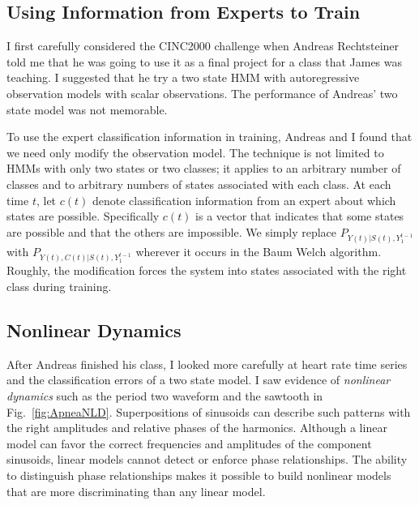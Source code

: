 \documentclass[]{article}
\newcommand{\ts}[3]{#1_{#2}^{#3}}                    %
\newcommand{\ti}[2]{{#1}{(#2)}}                  %
\begin{document}
\newcommand{\tmo}{i} %
\newcommand{\tex}{j} %
\newcommand{\tpo}{k} %

\subsection{Using Information from Experts to Train}

I first carefully considered the CINC2000 challenge when Andreas
Rechtsteiner told me that he was going to use it as a final project
for a class that James was teaching.  I suggested that he try a two
state HMM with autoregressive observation models with scalar observations.  The performance of Andreas' two state model was not
memorable.

To use the expert classification information in training, Andreas and
I found that we need only modify the observation model.  The technique
is not limited to HMMs with only two states or two classes; it applies
to an arbitrary number of classes and to arbitrary numbers of states
associated with each class.  At each time $t$, let $\ti{c}{t}$ denote
classification information from an expert about which states are
possible.  Specifically $\ti{c}{t}$ is a vector that indicates that
some states are possible and that the others are impossible.  We
simply replace $P_{\ti{Y}{t}|\ti{S}{t},\ts{Y}{1}{t-1}}$ with
$P_{\ti{Y}{t},\ti{C}{t}|\ti{S}{t},\ts{Y}{1}{t-1}}$ wherever it occurs
in the Baum Welch algorithm. Roughly, the
modification forces the system into states associated with the right
class during training.

\subsection{Nonlinear Dynamics}\label{sec:NLD}

After Andreas finished his class, I looked more carefully at heart
rate time series and the classification errors of a two state model.
I saw evidence of \emph{nonlinear dynamics} such as the period two
waveform and the sawtooth in Fig.~\ref{fig:ApneaNLD}.  Superpositions
of sinusoids can describe such patterns with the right amplitudes and
relative phases of the harmonics.  Although a linear model can favor
the correct frequencies and amplitudes of the component sinusoids,
linear models cannot detect or enforce phase relationships.  The
ability to distinguish phase relationships makes it possible to build
nonlinear models that are more discriminating than any linear model.
\end{document}
